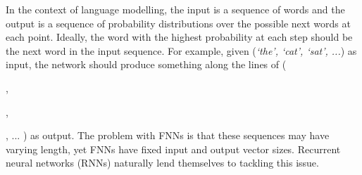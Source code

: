 \documentclass[a4paper, 12pt]{report}
\newcommand{\tit}[1]{\textit{#1}}
\begin{document}
In the context of language modelling, the input is a sequence of words and the output is a sequence of probability distributions over the possible next words at each point. Ideally, the word with the highest probability at each step should be the next word in the input sequence. For example, given (\tit{`the', `cat', `sat', ...}) as input, the network should produce something along the lines of (~%
, %
, %
, %
... ) as output. The problem with FNNs is that these sequences may have varying length, yet FNNs have fixed input and output vector sizes. Recurrent neural networks (RNNs) naturally lend themselves to tackling this issue. \\
\end{document}
